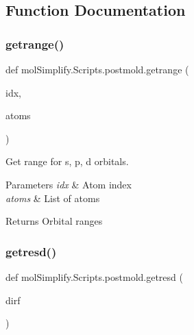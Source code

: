 \subsection{Function Documentation}
\mbox{\label{namespacemolSimplify_1_1Scripts_1_1postmold_a261c4fb44005b251970f00bd86df8872}} 
\subsubsection{\texorpdfstring{getrange()}{getrange()}}
{\footnotesize\ttfamily def mol\+Simplify.\+Scripts.\+postmold.\+getrange (\begin{DoxyParamCaption}\item[{}]{idx,  }\item[{}]{atoms }\end{DoxyParamCaption})}



Get range for s, p, d orbitals. 


\begin{DoxyParams}{Parameters}
{\em idx} & Atom index \\
\hline
{\em atoms} & List of atoms \\
\hline
\end{DoxyParams}
\begin{DoxyReturn}{Returns}
Orbital ranges 
\end{DoxyReturn}
\mbox{\label{namespacemolSimplify_1_1Scripts_1_1postmold_ad04b91cd386072cd6630146dc2f7f3c4}} 
\subsubsection{\texorpdfstring{getresd()}{getresd()}}
{\footnotesize\ttfamily def mol\+Simplify.\+Scripts.\+postmold.\+getresd (\begin{DoxyParamCaption}\item[{}]{dirf }\end{DoxyParamCaption})}




